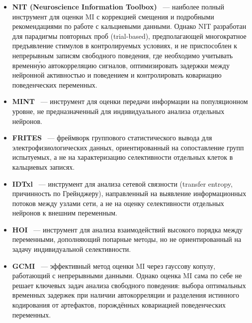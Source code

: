 \begin{itemize}
    \item \textbf{NIT (Neuroscience Information Toolbox)}~\cite{Maffulli2022} --- наиболее полный инструмент для оценки MI с коррекцией смещения и подробными рекомендациями по работе с кальциевыми данными. Однако NIT разработан для парадигмы повторных проб (trial-based), предполагающей многократное предъявление стимулов в контролируемых условиях, и не приспособлен к непрерывным записям свободного поведения, где необходимо учитывать временн\'{у}ю автокорреляцию сигналов, оптимизировать задержки между нейронной активностью и поведением и контролировать ковариацию поведенческих переменных.

    \item \textbf{MINT}~\cite{Lorenz2025} --- инструмент для оценки передачи информации на популяционном уровне, не предназначенный для индивидуального анализа отдельных нейронов.

    \item \textbf{FRITES}~\cite{Combrisson2022} --- фреймворк группового статистического вывода для электрофизиологических данных, ориентированный на сопоставление групп испытуемых, а не на характеризацию селективности отдельных клеток в кальциевых записях.

    \item \textbf{IDTxl}~\cite{IDTxl2019} --- инструмент для анализа сетевой связности (transfer entropy, причинность по Грейнджеру), направленный на выявление информационных потоков между узлами сети, а не на оценку селективности отдельных нейронов к внешним переменным.

    \item \textbf{HOI}~\cite{Neri2024} --- инструмент для анализа взаимодействий высокого порядка между переменными, дополняющий попарные методы, но не ориентированный на задачу индивидуальной селективности.

    \item \textbf{GCMI}~\cite{Ince2017} --- эффективный метод оценки MI через гауссову копулу, работающий с непрерывными данными. Однако оценка MI сама по себе не решает ключевых задач анализа свободного поведения: выбора оптимальных временных задержек при наличии автокорреляции и разделения истинного кодирования от артефактов, порождённых ковариацией поведенческих переменных.
\end{itemize}

